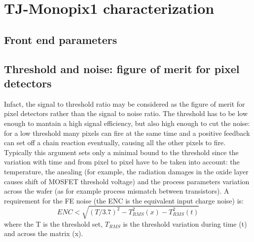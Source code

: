 
\section{TJ-Monopix1 characterization}
    \subsection{Front end parameters}


    \subsection{Threshold and noise: figure of merit for pixel detectors}
        Infact, the signal to threshold ratio may be considered as the figure of merit for pixel detectors rather than the signal to noise ratio.
        The threshold has to be low enough to mantain a high signal efficiency, but also high enough to cut the noise: for a low threshold many pixels can fire at the same time and a positive feedback can set off a chain reaction eventually, causing all the other pixels to fire. 
        Typically this argument sets only a minimal bound to the threshold since the variation with time and from pixel to pixel have to be taken into account: the temperature, the anealing (for example, the radiation damages in the oxide layer causes shift of MOSFET threshold voltage) and the process parameters variation across the wafer (as for example process mismatch between transistors). 
        A requirement for the FE noise (the ENC is the equivalent input charge noise) is: 
        \begin{equation}
            ENC < \sqrt{(T/3.7)^2 - T_{RMS} ^2 (x) - T_{RMS} ^2 (t)}
        \end{equation}
        where the T is the threshold set, $T_{RMS}$ is the threshold variation during time (t) and across the matrix (x).

